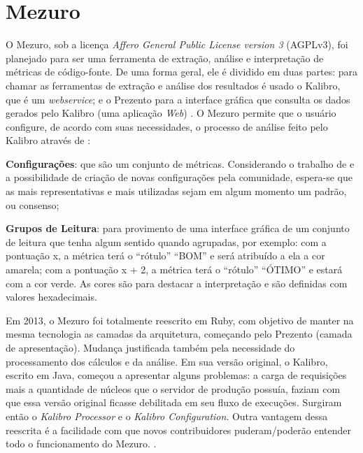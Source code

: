 \chapter{Mezuro}\label{chap:mezuro}

O Mezuro, sob a licença \textit{Affero General Public License version 3} (AGPLv3),
foi planejado para ser uma ferramenta de extração, análise e interpretação de
métricas de código-fonte. De uma forma geral, ele é dividido em duas partes:
para chamar as ferramentas de extração e análise dos resultados é usado o
Kalibro, que é um \textit{webservice}; e o Prezento para a interface gráfica que
consulta os dados gerados pelo Kalibro (uma aplicação \textit{Web})
\cite{meirellesCibse2015}. O Mezuro permite que o usuário configure, de acordo
com suas necessidades, o processo de análise feito pelo Kalibro através de
\cite{camarinhaOSS2015}:

\begin{description}
  \item \textbf{Configurações}: que são um conjunto de métricas. Considerando o
  trabalho de  e a possibilidade de
  criação de novas configurações pela comunidade, espera-se que as mais
  representativas e mais utilizadas sejam em algum momento um padrão, ou
  consenso;
  \item \textbf{Grupos de Leitura}:  para provimento de uma
  interface gráfica de um conjunto de leitura que tenha algum sentido quando
  agrupadas, por exemplo: com a pontuação x, a métrica terá o ``rótulo'' ``BOM'' e
  será atribuído a ela a cor amarela; com a pontuação x + 2, a métrica terá o
  ``rótulo'' ``ÓTIMO'' e estará com a cor verde. As cores são para destacar a
  interpretação e são definidas com valores hexadecimais.
\end{description}

Em 2013, o Mezuro foi totalmente reescrito em Ruby, com objetivo de manter na
mesma tecnologia as camadas da arquitetura, começando pelo Prezento (camada de
apresentação). Mudança justificada também pela necessidade do processamento dos
cálculos e da análise. Em sua versão original, o Kalibro, escrito em Java,
começou a apresentar alguns problemas: a carga de requisições mais a quantidade
de núcleos que o servidor de produção possuía, faziam com que essa versão
original ficasse debilitada em seu fluxo de execuções. Surgiram então o
\textit{Kalibro Processor} e o \textit{Kalibro Configuration}. Outra vantagem
dessa reescrita é a facilidade com que novos contribuidores puderam/poderão
entender todo o funcionamento do Mezuro. \cite{meirellesCibse2015}.

